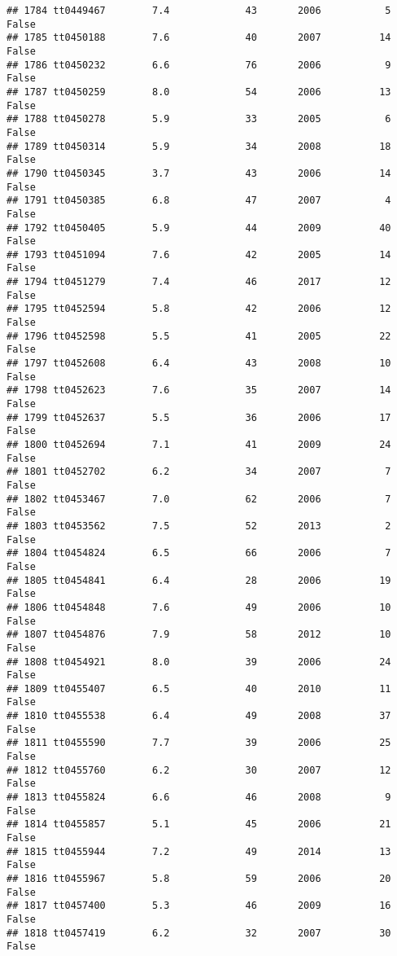\documentclass[
]{article}
\begin{document}
\begin{verbatim}
## 1784 tt0449467        7.4             43       2006           5   False
## 1785 tt0450188        7.6             40       2007          14   False
## 1786 tt0450232        6.6             76       2006           9   False
## 1787 tt0450259        8.0             54       2006          13   False
## 1788 tt0450278        5.9             33       2005           6   False
## 1789 tt0450314        5.9             34       2008          18   False
## 1790 tt0450345        3.7             43       2006          14   False
## 1791 tt0450385        6.8             47       2007           4   False
## 1792 tt0450405        5.9             44       2009          40   False
## 1793 tt0451094        7.6             42       2005          14   False
## 1794 tt0451279        7.4             46       2017          12   False
## 1795 tt0452594        5.8             42       2006          12   False
## 1796 tt0452598        5.5             41       2005          22   False
## 1797 tt0452608        6.4             43       2008          10   False
## 1798 tt0452623        7.6             35       2007          14   False
## 1799 tt0452637        5.5             36       2006          17   False
## 1800 tt0452694        7.1             41       2009          24   False
## 1801 tt0452702        6.2             34       2007           7   False
## 1802 tt0453467        7.0             62       2006           7   False
## 1803 tt0453562        7.5             52       2013           2   False
## 1804 tt0454824        6.5             66       2006           7   False
## 1805 tt0454841        6.4             28       2006          19   False
## 1806 tt0454848        7.6             49       2006          10   False
## 1807 tt0454876        7.9             58       2012          10   False
## 1808 tt0454921        8.0             39       2006          24   False
## 1809 tt0455407        6.5             40       2010          11   False
## 1810 tt0455538        6.4             49       2008          37   False
## 1811 tt0455590        7.7             39       2006          25   False
## 1812 tt0455760        6.2             30       2007          12   False
## 1813 tt0455824        6.6             46       2008           9   False
## 1814 tt0455857        5.1             45       2006          21   False
## 1815 tt0455944        7.2             49       2014          13   False
## 1816 tt0455967        5.8             59       2006          20   False
## 1817 tt0457400        5.3             46       2009          16   False
## 1818 tt0457419        6.2             32       2007          30   False

\end{verbatim}
\end{document}
